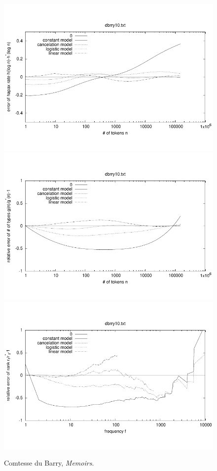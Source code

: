 \documentclass[a4paper,12pt]{article}
\begin{document}
\begin{figure}[p]
  \centering
  \vspace{-2em}
  \includegraphics[width=0.8\columnwidth]{output/herdan/dbrry10_27/token_ratio_residual.pdf}
  \\[-3em]
  \includegraphics[width=0.8\columnwidth]{output/herdan/dbrry10_27/token_residual.pdf}
  \\[-3em]
  \includegraphics[width=0.8\columnwidth]{output/herdan/dbrry10_27/frequency_residual.pdf}
  \vspace{-2em}
  \caption{Comtesse du Barry, \emph{Memoirs}.\label{figdbrry10R}}
\end{figure}
\end{document}
